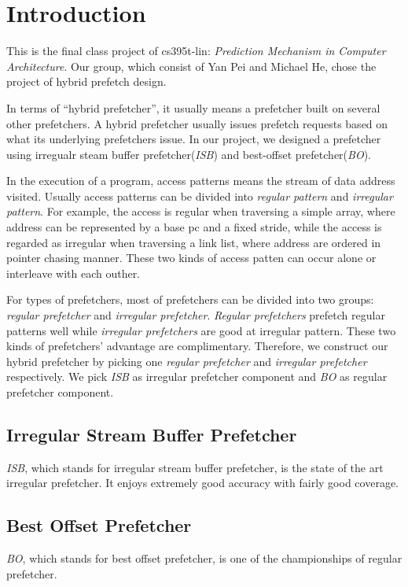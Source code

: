 \section{Introduction}
\label{sec:intro}

This is the final class project of cs395t-lin: \emph{Prediction Mechanism in Computer Architecture}. Our group, which consist of Yan Pei and Michael He, chose the project of hybrid prefetch design.

In terms of ``hybrid prefetcher'', it usually means a prefetcher built on several other prefetchers. A hybrid prefetcher usually issues prefetch requests based on what its underlying prefetchers issue. In our project, we designed a prefetcher using irregualr steam buffer prefetcher(\emph{ISB})\cite{isbpaper} and best-offset prefetcher(\emph{BO})\cite{bopaper}.

In the execution of a program, access patterns means the stream of data address visited. Usually access patterns can be divided into \emph{regular pattern} and \emph{irregular pattern}. For example, the access is regular when traversing a simple array, where address can be represented by a base pc and a fixed stride, while the access is regarded as irregular when traversing a link list, where address are ordered in pointer chasing manner. These two kinds of access patten can occur alone or interleave with each outher.

For types of prefetchers, most of prefetchers can be divided into two groups: \emph{regular prefetcher}\cite{bopaper, sandboxpaper} and \emph{irregular prefetcher}\cite{isbpaper, ghbpaper, reinforcementlearning}. \emph{Regular prefetchers} prefetch regular patterns well while \emph{irregular prefetchers} are good at irregular pattern. These two kinds of prefetchers' advantage are complimentary. Therefore, we construct our hybrid prefetcher by picking one \emph{regular prefetcher} and \emph{irregular prefetcher} respectively. We pick \emph{ISB}\cite{isbpaper} as irregular prefetcher component and \emph{BO}\cite{bopaper} as regular prefetcher component.

  \subsection{Irregular Stream Buffer Prefetcher}
  \label{sec:isbintro}

  \emph{ISB}, which stands for irregular stream buffer prefetcher, is the state of the art irregular prefetcher. It enjoys extremely good accuracy with fairly good coverage.

  \subsection{Best Offset Prefetcher}
  \label{sec:bointro}
  \emph{BO}, which stands for best offset prefetcher, is one of the championships of regular prefetcher.  
